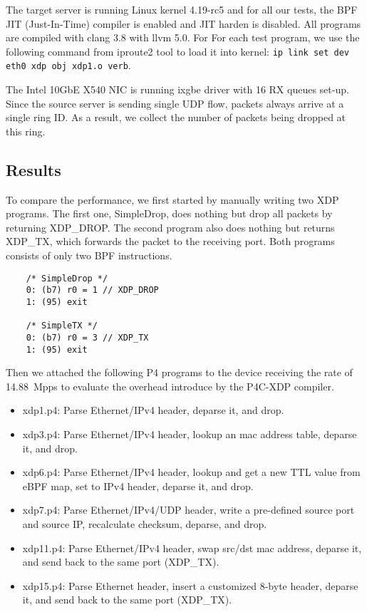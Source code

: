 The target server is running Linux kernel 4.19-rc5 and for all our
tests, the BPF JIT (Just-In-Time) compiler is enabled and JIT harden
is disabled. All programs are compiled with clang 3.8 with llvm 5.0.
For For each test program, we use the following
command from iproute2 tool to load it into kernel:
\texttt{ip link set dev eth0 xdp obj xdp1.o verb}.

The Intel 10GbE X540 NIC is running ixgbe driver with 16 RX queues
set-up. Since the source server is sending single UDP flow, packets
always arrive at a single ring ID.  As a result, we collect the number
of packets being dropped at this ring.

\subsection{Results}
To compare the performance, we first started by manually writing two
XDP programs. The first one, SimpleDrop, does nothing but drop all packets by
returning XDP\_DROP. The second program also does nothing but returns
XDP\_TX, which forwards the packet to the receiving port.  Both programs
consists of only two BPF instructions.

{\small
\begin{verbatim}
    /* SimpleDrop */
    0: (b7) r0 = 1 // XDP_DROP
    1: (95) exit

    /* SimpleTX */
    0: (b7) r0 = 3 // XDP_TX
    1: (95) exit
\end{verbatim}
}
Then we attached the following P4 programs to the device receiving the
rate of 14.88~Mpps to evaluate the overhead introduce by the P4C-XDP
compiler.
\begin{itemize}
\item xdp1.p4: Parse Ethernet/IPv4 header, deparse it, and drop.
\item xdp3.p4: Parse Ethernet/IPv4 header, lookup an mac address
table, deparse it, and drop.
\item xdp6.p4: Parse Ethernet/IPv4 header, lookup and get a new TTL value
from eBPF map, set to IPv4 header, deparse it, and drop.
\item xdp7.p4: Parse Ethernet/IPv4/UDP header, write a pre-defined source port
and source IP, recalculate checksum, deparse, and drop.
\item xdp11.p4: Parse Ethernet/IPv4 header, swap src/dst mac address,
deparse it, and send back to the same port (XDP\_TX).
\item xdp15.p4: Parse Ethernet header, insert a customized 8-byte header,
deparse it, and send back to the same port (XDP\_TX).
\end{itemize}

